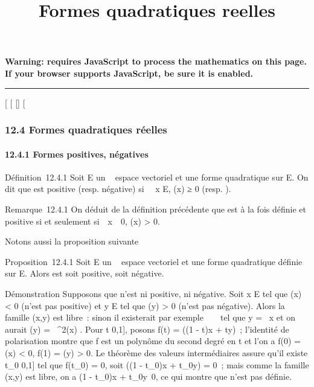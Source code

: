 \documentclass[]{article}
\title{Formes quadratiques reelles}
\author{}
\date{}
\begin{document}
\maketitle

\textbf{Warning: 
requires JavaScript to process the mathematics on this page.\\ If your
browser supports JavaScript, be sure it is enabled.}

\begin{center}\rule{3in}{0.4pt}\end{center}

{[}
{[}
{[}{]}
{[}

\subsubsection{12.4 Formes quadratiques réelles}

\paragraph{12.4.1 Formes positives, négatives}

Définition~12.4.1 Soit E un ~ espace vectoriel et \Phi une forme
quadratique sur E. On dit que \Phi est positive (resp. négative) si
\forall~~x \in E, \Phi(x) ≥ 0 (resp. ).

Remarque~12.4.1 On déduit de la définition précédente que \Phi est à la
fois définie et positive si et seulement
si~\forall~x\mathrel\neq~~0, \Phi(x)
\textgreater{} 0.

Notons aussi la proposition suivante

Proposition~12.4.1 Soit E un ~ espace vectoriel et \Phi une forme
quadratique définie sur E. Alors \Phi est soit positive, soit négative.

Démonstration Supposons que \Phi n'est ni positive, ni négative. Soit x \in E
tel que \Phi(x) \textless{} 0 (\Phi n'est pas positive) et y \in E tel que \Phi(y)
\textgreater{} 0 (\Phi n'est pas négative). Alors la famille (x,y) est
libre~: sinon il existerait par exemple \lambda~ \in {}~ tel que y = \lambda~x et on
aurait \Phi(y) = \lambda~^2\Phi(x) . Pour t \in {[}0,1{]}, posons f(t) =
\Phi((1 - t)x + ty)~; l'identité de polarisation montre que f est un
polynôme du second degré en t et l'on a f(0) = \Phi(x) \textless{} 0, f(1)
= \Phi(y) \textgreater{} 0. Le théorème des valeurs intermédiaires assure
qu'il existe t\_0 \in {[}0,1{]} tel que f(t\_0) = 0, soit
\Phi((1 - t\_0)x + t\_0y) = 0~; mais comme la famille (x,y)
est libre, on a (1 - t\_0)x +
t\_0y\neq~0, ce qui montre que \Phi n'est
pas définie.
\end{document}
